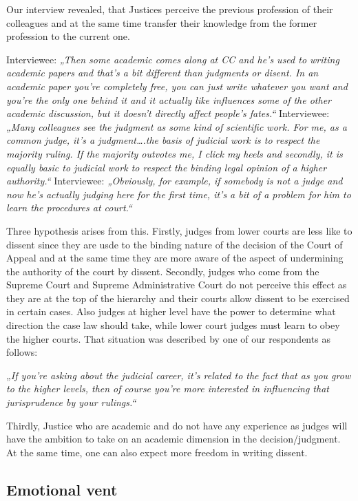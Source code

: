 \documentclass[
  11pt,
]{article}
\begin{document}
Our interview revealed, that Justices perceive the previous profession
of their colleagues and at the same time transfer their knowledge from
the former profession to the current one.

Interviewee: \emph{„Then some academic comes along at CC and he's used
to writing academic papers and that's a bit different than judgments or
disent. In an academic paper you're completely free, you can just write
whatever you want and you're the only one behind it and it actually like
influences some of the other academic discussion, but it doesn't
directly affect people's fates.``} Interviewee: \emph{„Many colleagues
see the judgment as some kind of scientific work. For me, as a common
judge, it's a judgment\ldots.the basis of judicial work is to respect
the majority ruling. If the majority outvotes me, I click my heels and
secondly, it is equally basic to judicial work to respect the binding
legal opinion of a higher authority.``} Interviewee: \emph{„Obviously,
for example, if somebody is not a judge and now he's actually judging
here for the first time, it's a bit of a problem for him to learn the
procedures at court.``}

Three hypothesis arises from this. Firstly, judges from lower courts are
less like to dissent since they are usde to the binding nature of the
decision of the Court of Appeal and at the same time they are more aware
of the aspect of undermining the authority of the court by dissent.
Secondly, judges who come from the Supreme Court and Supreme
Administrative Court do not perceive this effect as they are at the top
of the hierarchy and their courts allow dissent to be exercised in
certain cases. Also judges at higher level have the power to determine
what direction the case law should take, while lower court judges must
learn to obey the higher courts. That situation was described by one of
our respondents as follows:

\emph{„If you're asking about the judicial career, it's related to the
fact that as you grow to the higher levels, then of course you're more
interested in influencing that jurisprudence by your rulings.``}

Thirdly, Justice who are academic and do not have any experience as
judges will have the ambition to take on an academic dimension in the
decision/judgment. At the same time, one can also expect more freedom in
writing dissent.

\hypertarget{emotional-vent}{%
\subsection{Emotional vent}\label{emotional-vent}}
\end{document}
